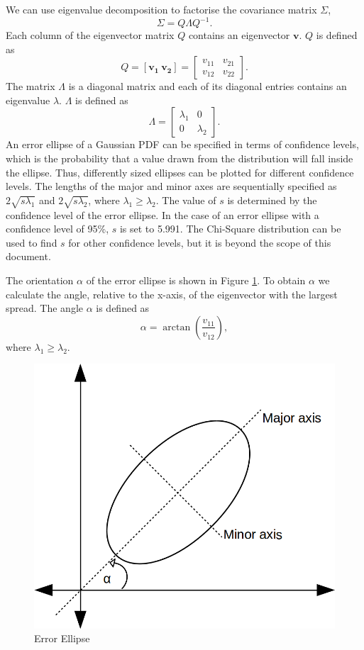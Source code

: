 \documentclass[12pt,oneside,openany,a4paper, %
afrikaans,english,
]{memoir}
\numberwithin{equation}{chapter}
\begin{document}
We can use eigenvalue decomposition to factorise the covariance matrix $\Sigma$,
\begin{equation}
\Sigma = Q\Lambda Q^{-1}.
\end{equation}
Each column of the eigenvector matrix $Q$ contains an eigenvector $\bm{v}$. $Q$ is defined as
\begin{equation}
Q =
[\bm{v_1} \ \bm{v_2}]
=
\begin{bmatrix}
v_{11} & v_{21}\\
v_{12} & v_{22}
\end{bmatrix}.
\end{equation}
The matrix $\Lambda$ is a diagonal matrix and each of its diagonal entries contains an eigenvalue $\lambda$. $\Lambda$ is defined as 
\begin{equation}
\Lambda =
\begin{bmatrix}
\lambda_1 & 0\\
0 & \lambda_2
\end{bmatrix}.
\end{equation}
An error ellipse of a Gaussian PDF can be specified in terms of confidence levels, which is the probability that a value drawn from the distribution will fall inside the ellipse. Thus, differently sized ellipses can be plotted for different confidence levels. The lengths of the major and minor axes are sequentially specified as $2\sqrt{s\lambda_1}$ and $2\sqrt{s\lambda_2}$, where $\lambda_1 \geq \lambda_2$. The value of $s$ is determined by the confidence level of the error ellipse. In the case of an error ellipse with a confidence level of 95\%, $s$ is set to 5.991. The Chi-Square distribution can be used to find $s$ for other confidence levels, but it is beyond the scope of this document.

The orientation $\alpha$ of the error ellipse is shown in Figure \ref{fig:e_ellipse}. To obtain $\alpha$ we calculate the angle, relative to the x-axis, of the eigenvector with the largest spread. The angle $\alpha$ is defined as
\begin{equation}
\alpha = \arctan\left(\frac{v_{11}}{v_{12}}\right),
\end{equation}
where $\lambda_1 \geq \lambda_2$.

\begin{figure}[H]
  \includegraphics[width=0.5\linewidth]{Figures/e_ellipse.png}
  \centering
  \caption{Error Ellipse}
  \label{fig:e_ellipse}
\end{figure}
\end{document}
